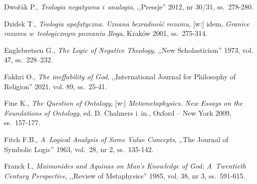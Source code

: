 \begin{thebibliography}{100}
Dwořák P., \textit{Teologia negatywna i~analogia}, ,,Pressje'' 2012, nr 30/31, ss.~278-280.

Dzidek T., \textit{Teologia apofatyczna. Uznana bezradność rozumu}, [w:] idem, \textit{Granice rozumu w~teologicznym poznaniu Boga}, Kraków 2001, ss.~275-314.

Englebretsen G., \textit{The Logic of Negative Theology}, ,,New Scholasticism'' 1973, vol. 47, ss.~228--232.



Fakhri O., \textit{The ineffability of God}, ,,International Journal for Philosophy of Religion'' 2021, vol. 89, ss.~25-41.

Fine K., \textit{The Question of Ontology}, [w:] \textit{Metametaphysics. New Essays on the Foundations of Ontology},
ed. D. Chalmers i~in., Oxford -- New York 2009, ss.~157-177.


Fitch F.B., \textit{A~Logical Analysis of Some Value Concepts}, ,,The Journal of Symbolic Logic'' 1963, vol.~28, nr 2, ss.~135-142.

Franck I., \textit{Maimonides and Aquinas on Man's Knowledge of God: A~Twentieth Century Perspective}, ,,Review of Metaphysics'' 1985, vol. 38, nr 3, ss.~591-615.



\end{thebibliography}
